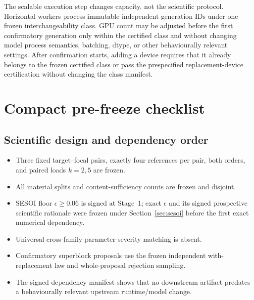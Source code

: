 \documentclass[11pt,a4paper]{article}
\begin{document}
The scalable execution step changes capacity, not the scientific protocol. Horizontal workers process immutable independent generation IDs under one frozen interchangeability class. GPU count may be adjusted before the first confirmatory generation only within the certified class and without changing model process semantics, batching, dtype, or other behaviourally relevant settings. After confirmation starts, adding a device requires that it already belongs to the frozen certified class or pass the prespecified replacement-device certification without changing the class manifest.

\section{Compact pre-freeze checklist}

\subsection{Scientific design and dependency order}
\begin{itemize}
\item[$\square$] Three fixed target--focal pairs, exactly four references per pair, both orders, and paired loads $k=2,5$ are frozen.
\item[$\square$] All material splits and content-sufficiency counts are frozen and disjoint.
\item[$\square$] SESOI floor $\epsilon\ge0.06$ is signed at Stage~1; exact $\epsilon$ and its signed prospective scientific rationale were frozen under Section~\ref{sec:sesoi} before the first exact numerical dependency.
\item[$\square$] Universal cross-family parameter-severity matching is absent.
\item[$\square$] Confirmatory superblock proposals use the frozen independent with-replacement law and whole-proposal rejection sampling.
\item[$\square$] The signed dependency manifest shows that no downstream artifact predates a behaviourally relevant upstream runtime/model change.
\end{itemize}
\end{document}

